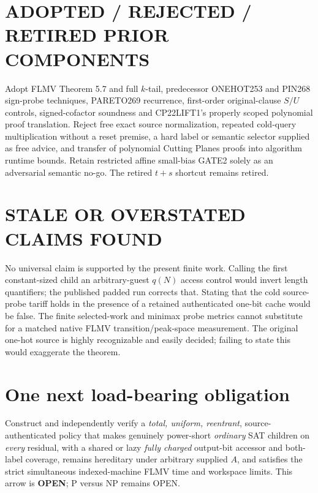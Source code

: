 \documentclass[11pt]{article}
\begin{document}
\section{ADOPTED / REJECTED / RETIRED PRIOR COMPONENTS}
Adopt FLMV Theorem 5.7 and full $k$-tail, predecessor ONEHOT253 and PIN268 sign-probe techniques, PARETO269 recurrence, first-order original-clause $S/U$ controls, signed-cofactor soundness and CP22LIFT1's properly scoped polynomial proof translation. Reject free exact source normalization, repeated cold-query multiplication without a reset premise, a hard label or semantic selector supplied as free advice, and transfer of polynomial Cutting Planes proofs into algorithm runtime bounds. Retain restricted affine small-bias GATE2 solely as an adversarial semantic no-go. The retired $t+s$ shortcut remains retired.

\section{STALE OR OVERSTATED CLAIMS FOUND}
No universal claim is supported by the present finite work. Calling the first constant-sized child an arbitrary-guest $q(N)$ access control would invert length quantifiers; the published padded run corrects that. Stating that the cold source-probe tariff holds in the presence of a retained authenticated one-bit cache would be false. The finite selected-work and minimax probe metrics cannot substitute for a matched native FLMV transition/peak-space measurement. The original one-hot source is highly recognizable and easily decided; failing to state this would exaggerate the theorem.

\section{One next load-bearing obligation}
Construct and independently verify a \emph{total, uniform, reentrant}, source-authenticated policy that makes genuinely power-short \emph{ordinary} SAT children on \emph{every} residual, with a shared or lazy \emph{fully charged} output-bit accessor and both-label coverage, remains hereditary under arbitrary supplied $A$, and satisfies the strict simultaneous indexed-machine FLMV time and workspace limits. This arrow is \textbf{OPEN}; P versus NP remains OPEN.
\end{document}
